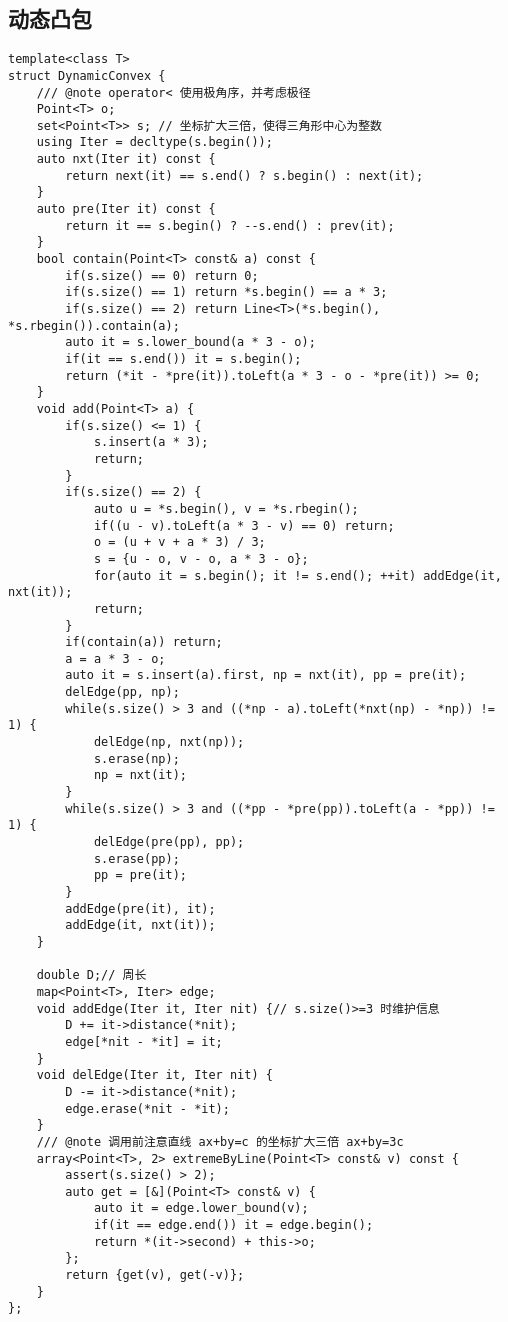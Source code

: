 \subsection{动态凸包}
\begin{lstlisting}
template<class T>
struct DynamicConvex {
    /// @note operator< 使用极角序，并考虑极径
    Point<T> o;
    set<Point<T>> s; // 坐标扩大三倍，使得三角形中心为整数
    using Iter = decltype(s.begin());
    auto nxt(Iter it) const {
        return next(it) == s.end() ? s.begin() : next(it);
    }
    auto pre(Iter it) const {
        return it == s.begin() ? --s.end() : prev(it);
    }
    bool contain(Point<T> const& a) const {
        if(s.size() == 0) return 0;
        if(s.size() == 1) return *s.begin() == a * 3;
        if(s.size() == 2) return Line<T>(*s.begin(), *s.rbegin()).contain(a);
        auto it = s.lower_bound(a * 3 - o);
        if(it == s.end()) it = s.begin();
        return (*it - *pre(it)).toLeft(a * 3 - o - *pre(it)) >= 0;
    }
    void add(Point<T> a) {
        if(s.size() <= 1) {
            s.insert(a * 3);
            return;
        }
        if(s.size() == 2) {
            auto u = *s.begin(), v = *s.rbegin();
            if((u - v).toLeft(a * 3 - v) == 0) return;
            o = (u + v + a * 3) / 3;
            s = {u - o, v - o, a * 3 - o};
            for(auto it = s.begin(); it != s.end(); ++it) addEdge(it, nxt(it));
            return;
        }
        if(contain(a)) return;
        a = a * 3 - o;
        auto it = s.insert(a).first, np = nxt(it), pp = pre(it);
        delEdge(pp, np);
        while(s.size() > 3 and ((*np - a).toLeft(*nxt(np) - *np)) != 1) {
            delEdge(np, nxt(np));
            s.erase(np);
            np = nxt(it);
        }
        while(s.size() > 3 and ((*pp - *pre(pp)).toLeft(a - *pp)) != 1) {
            delEdge(pre(pp), pp);
            s.erase(pp);
            pp = pre(it);
        }
        addEdge(pre(it), it);
        addEdge(it, nxt(it));
    }

    double D;// 周长
    map<Point<T>, Iter> edge;
    void addEdge(Iter it, Iter nit) {// s.size()>=3 时维护信息
        D += it->distance(*nit);
        edge[*nit - *it] = it;
    }
    void delEdge(Iter it, Iter nit) {
        D -= it->distance(*nit);
        edge.erase(*nit - *it);
    }
    /// @note 调用前注意直线 ax+by=c 的坐标扩大三倍 ax+by=3c
    array<Point<T>, 2> extremeByLine(Point<T> const& v) const {
        assert(s.size() > 2);
        auto get = [&](Point<T> const& v) {
            auto it = edge.lower_bound(v);
            if(it == edge.end()) it = edge.begin();
            return *(it->second) + this->o;
        };
        return {get(v), get(-v)};
    }
};
\end{lstlisting}

